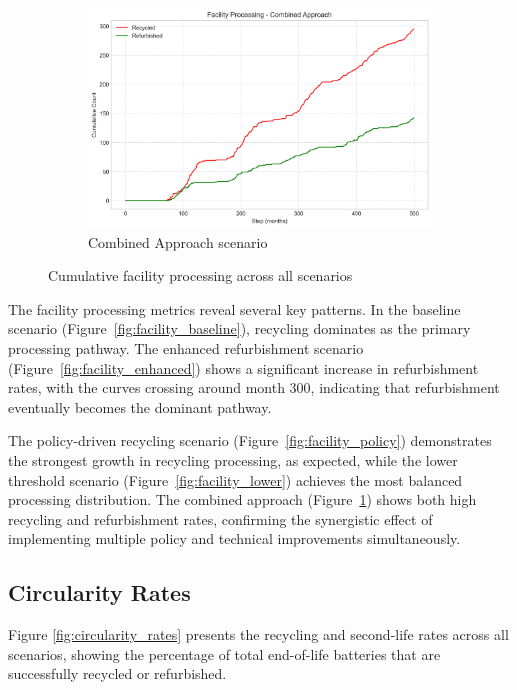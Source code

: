\begin{figure}[htbp]
\vspace{0.2cm}
\begin{subfigure}{0.42\textwidth}
    \includegraphics[width=\textwidth]{figures/combined_approach_facility_processing.png}
    \caption{Combined Approach scenario}
    \label{fig:facility_combined}
\end{subfigure}
\caption{Cumulative facility processing across all scenarios}
\label{fig:facility_processing}
\end{figure}

The facility processing metrics reveal several key patterns. In the baseline scenario (Figure~\ref{fig:facility_baseline}), recycling dominates as the primary processing pathway. The enhanced refurbishment scenario (Figure~\ref{fig:facility_enhanced}) shows a significant increase in refurbishment rates, with the curves crossing around month 300, indicating that refurbishment eventually becomes the dominant pathway.

The policy-driven recycling scenario (Figure~\ref{fig:facility_policy}) demonstrates the strongest growth in recycling processing, as expected, while the lower threshold scenario (Figure~\ref{fig:facility_lower}) achieves the most balanced processing distribution. The combined approach (Figure~\ref{fig:facility_combined}) shows both high recycling and refurbishment rates, confirming the synergistic effect of implementing multiple policy and technical improvements simultaneously.

\subsection{Circularity Rates}
Figure \ref{fig:circularity_rates} presents the recycling and second-life rates across all scenarios, showing the percentage of total end-of-life batteries that are successfully recycled or refurbished.

